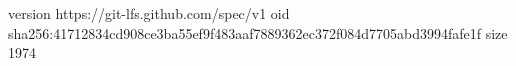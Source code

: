 version https://git-lfs.github.com/spec/v1
oid sha256:41712834cd908ce3ba55ef9f483aaf7889362ec372f084d7705abd3994fafe1f
size 1974
